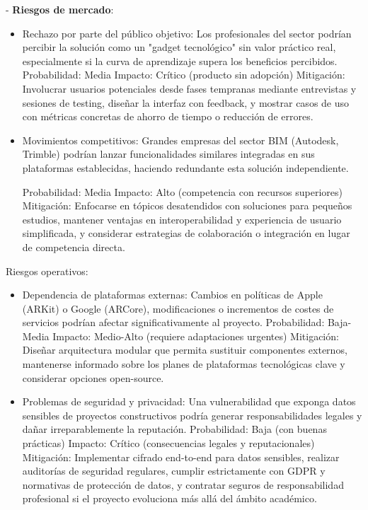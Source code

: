 - \textbf{Riesgos de mercado}:
\begin{itemize}
\item Rechazo por parte del público objetivo: Los profesionales del sector podrían percibir la solución como un "gadget tecnológico" sin valor práctico real, especialmente si la curva de aprendizaje supera los beneficios percibidos.
    Probabilidad: Media
    Impacto: Crítico (producto sin adopción)
    Mitigación: Involucrar usuarios potenciales desde fases tempranas mediante entrevistas y sesiones de testing, diseñar la interfaz con feedback, y mostrar casos de uso con métricas concretas de ahorro de tiempo o reducción de errores.

\item Movimientos competitivos: Grandes empresas del sector BIM (Autodesk, Trimble) podrían lanzar funcionalidades similares integradas en sus plataformas establecidas, haciendo redundante esta solución independiente.

    Probabilidad: Media
    Impacto: Alto (competencia con recursos superiores)
    Mitigación: Enfocarse en tópicos desatendidos con soluciones para pequeños estudios, mantener ventajas en interoperabilidad y experiencia de usuario simplificada, y considerar estrategias de colaboración o integración en lugar de competencia directa.
\end{itemize}
Riesgos operativos:
\begin{itemize}
\item Dependencia de plataformas externas: Cambios en políticas de Apple (ARKit) o Google (ARCore), modificaciones o incrementos de costes de servicios podrían afectar significativamente al proyecto.
    Probabilidad: Baja-Media
    Impacto: Medio-Alto (requiere adaptaciones urgentes)
    Mitigación: Diseñar arquitectura modular que permita sustituir componentes externos, mantenerse informado sobre los planes de plataformas tecnológicas clave y considerar opciones open-source.

\item Problemas de seguridad y privacidad: Una vulnerabilidad que exponga datos sensibles de proyectos constructivos podría generar responsabilidades legales y dañar irreparablemente la reputación.
    Probabilidad: Baja (con buenas prácticas)
    Impacto: Crítico (consecuencias legales y reputacionales)
    Mitigación: Implementar cifrado end-to-end para datos sensibles, realizar auditorías de seguridad regulares, cumplir estrictamente con GDPR y normativas de protección de datos, y contratar seguros de responsabilidad profesional si el proyecto evoluciona más allá del ámbito académico.
\end{itemize}

